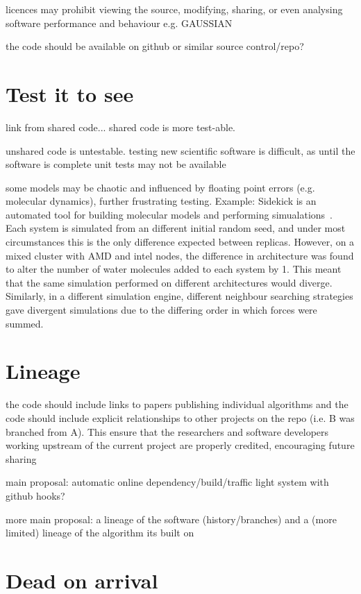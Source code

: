 \documentclass[conference]{IEEEtran}
\begin{document}
licences may prohibit viewing the source, modifying, sharing, or even
analysing software performance and behaviour e.g. GAUSSIAN~\cite{Giles2004}

the code should be available on github or similar source control/repo?

\section{Test it to see}
link from shared code... shared code is more test-able. 

unshared code is untestable.  testing new scientific software is
difficult, as until the software is complete unit tests may not be
available

some models may be chaotic and influenced by floating point errors
(e.g. molecular dynamics), further frustrating testing. Example:
Sidekick is an automated tool for building molecular models and
performing simualations~\cite{Hall2014Sidekick}. Each system is
simulated from an different initial random seed, and under most
circumstances this is the only difference expected between
replicas. However, on a mixed cluster with AMD and intel nodes, the
difference in architecture was found to alter the number of water
molecules added to each system by 1. This meant that the same
simulation performed on different architectures would
diverge. Similarly, in a different simulation engine, different
neighbour searching strategies gave divergent simulations due to the
differing order in which forces were summed.



\section{Lineage} 

the code should include links to papers publishing individual
algorithms and the code should include explicit relationships to other
projects on the repo (i.e. B was branched from A). This ensure that
the researchers and software developers working upstream of the
current project are properly credited, encouraging future sharing

main proposal: automatic online dependency/build/traffic light system
with github hooks?

more main proposal: a lineage of the software (history/branches) and a
(more limited) lineage of the algorithm its built on

\section{Dead on arrival}
\end{document}
